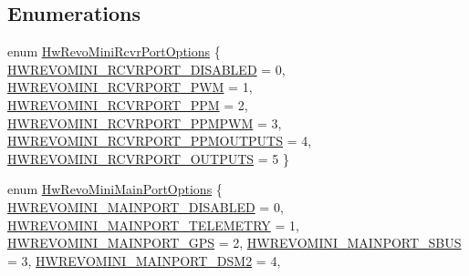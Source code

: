 \subsection*{\-Enumerations}
\begin{DoxyCompactItemize}
\item 
enum \hyperlink{group___hw_revo_mini_ga2a1ea7cccd19514cc37f2f9157345713}{\-Hw\-Revo\-Mini\-Rcvr\-Port\-Options} \{ \*
\hyperlink{group___hw_revo_mini_gga2a1ea7cccd19514cc37f2f9157345713a3d79e63467bc0d146e848a9137dd88e8}{\-H\-W\-R\-E\-V\-O\-M\-I\-N\-I\-\_\-\-R\-C\-V\-R\-P\-O\-R\-T\-\_\-\-D\-I\-S\-A\-B\-L\-E\-D} = 0, 
\hyperlink{group___hw_revo_mini_gga2a1ea7cccd19514cc37f2f9157345713ab3d3b4bff6c707a462c8badb272fb951}{\-H\-W\-R\-E\-V\-O\-M\-I\-N\-I\-\_\-\-R\-C\-V\-R\-P\-O\-R\-T\-\_\-\-P\-W\-M} = 1, 
\hyperlink{group___hw_revo_mini_gga2a1ea7cccd19514cc37f2f9157345713a8476dbc60fa8e4170b41ed8dbac9fe4a}{\-H\-W\-R\-E\-V\-O\-M\-I\-N\-I\-\_\-\-R\-C\-V\-R\-P\-O\-R\-T\-\_\-\-P\-P\-M} = 2, 
\hyperlink{group___hw_revo_mini_gga2a1ea7cccd19514cc37f2f9157345713af9fa6761ba1ba6d1caad2391df819dc5}{\-H\-W\-R\-E\-V\-O\-M\-I\-N\-I\-\_\-\-R\-C\-V\-R\-P\-O\-R\-T\-\_\-\-P\-P\-M\-P\-W\-M} = 3, 
\*
\hyperlink{group___hw_revo_mini_gga2a1ea7cccd19514cc37f2f9157345713a00c44495a99dcd4afb9d2a3a05cf8ee7}{\-H\-W\-R\-E\-V\-O\-M\-I\-N\-I\-\_\-\-R\-C\-V\-R\-P\-O\-R\-T\-\_\-\-P\-P\-M\-O\-U\-T\-P\-U\-T\-S} = 4, 
\hyperlink{group___hw_revo_mini_gga2a1ea7cccd19514cc37f2f9157345713ad152d70ec98c4b6579be2a7a8d6b0588}{\-H\-W\-R\-E\-V\-O\-M\-I\-N\-I\-\_\-\-R\-C\-V\-R\-P\-O\-R\-T\-\_\-\-O\-U\-T\-P\-U\-T\-S} = 5
 \}
\item 
enum \hyperlink{group___hw_revo_mini_ga20d56956ce6e880f1f1f115c915234bd}{\-Hw\-Revo\-Mini\-Main\-Port\-Options} \{ \*
\hyperlink{group___hw_revo_mini_gga20d56956ce6e880f1f1f115c915234bdadfeb39671be13c6f649b755e9ada0967}{\-H\-W\-R\-E\-V\-O\-M\-I\-N\-I\-\_\-\-M\-A\-I\-N\-P\-O\-R\-T\-\_\-\-D\-I\-S\-A\-B\-L\-E\-D} = 0, 
\hyperlink{group___hw_revo_mini_gga20d56956ce6e880f1f1f115c915234bda5fc76bbbdc20fdd4a8ff27dfea0eb96e}{\-H\-W\-R\-E\-V\-O\-M\-I\-N\-I\-\_\-\-M\-A\-I\-N\-P\-O\-R\-T\-\_\-\-T\-E\-L\-E\-M\-E\-T\-R\-Y} = 1, 
\hyperlink{group___hw_revo_mini_gga20d56956ce6e880f1f1f115c915234bdad0c47a9f6e0522cef2a32bdb43601829}{\-H\-W\-R\-E\-V\-O\-M\-I\-N\-I\-\_\-\-M\-A\-I\-N\-P\-O\-R\-T\-\_\-\-G\-P\-S} = 2, 
\hyperlink{group___hw_revo_mini_gga20d56956ce6e880f1f1f115c915234bda802c59c2bb79864d0c6fc81721b7e411}{\-H\-W\-R\-E\-V\-O\-M\-I\-N\-I\-\_\-\-M\-A\-I\-N\-P\-O\-R\-T\-\_\-\-S\-B\-U\-S} = 3, 
\*
\hyperlink{group___hw_revo_mini_gga20d56956ce6e880f1f1f115c915234bdac9af2a2886792a8dbd8d2aec3b7e947c}{\-H\-W\-R\-E\-V\-O\-M\-I\-N\-I\-\_\-\-M\-A\-I\-N\-P\-O\-R\-T\-\_\-\-D\-S\-M2} = 4, 

\end{DoxyCompactItemize}
